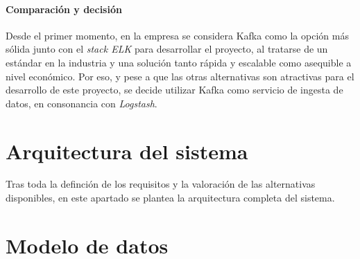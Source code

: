 \paragraph{Comparación y decisión}
Desde el primer momento, en la empresa se considera Kafka como la opción más
sólida junto con el \textit{stack ELK} para desarrollar el proyecto, al
tratarse de un estándar en la industria y una solución tanto rápida y escalable
como asequible a nivel económico. Por eso, y pese a que las otras alternativas
son atractivas para el desarrollo de este proyecto, se decide utilizar Kafka
como servicio de ingesta de datos, en consonancia con \textit{Logstash}.


\newpage{}
\section{Arquitectura del sistema}\label{sec:arquitectura}
Tras toda la definción de los requisitos y la valoración de las alternativas
disponibles, en este apartado se plantea la arquitectura completa del sistema.


\newpage{}
\section{Modelo de datos}\label{sec:modelo}
